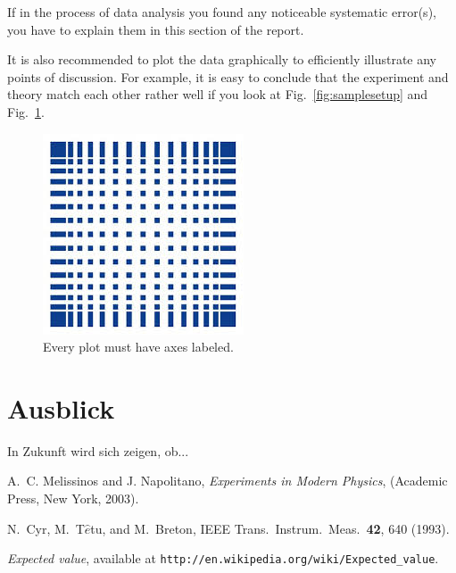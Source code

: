 \documentclass[letterpaper,12pt]{article}
\begin{document}
	If in the process of data analysis you found any noticeable systematic
	error(s), you have to explain them in this section of the report.
	
	It is also recommended to plot the data graphically to efficiently illustrate
	any points of discussion. For example, it is easy to conclude that the
	experiment and theory match each other rather well if you look at
	Fig.~\ref{fig:samplesetup} and Fig.~\ref{fig:exp_plots}.
	
	\begin{figure}[ht] 
		\centering
		\includegraphics[width=0.5\columnwidth]{Images/hsMannheim.jpg}
		
		\caption{
			\label{fig:exp_plots}  
			Every plot must have axes labeled.
		}
	\end{figure}
	
	
	\section{Ausblick}
	In Zukunft wird sich zeigen, ob...
	










	
	\begin{thebibliography}{99}
		
		A.~C. Melissinos and J. Napolitano, \textit{Experiments in Modern Physics},
		(Academic Press, New York, 2003).
		
		N.\ Cyr, M.\ T$\hat{e}$tu, and M.\ Breton,
		IEEE Trans.\ Instrum.\ Meas.\ \textbf{42}, 640 (1993).
		
		 \emph{Expected value},  available at
		\texttt{http://en.wikipedia.org/wiki/Expected\_value}.
		
	\end{thebibliography}
	
	
\end{document}
